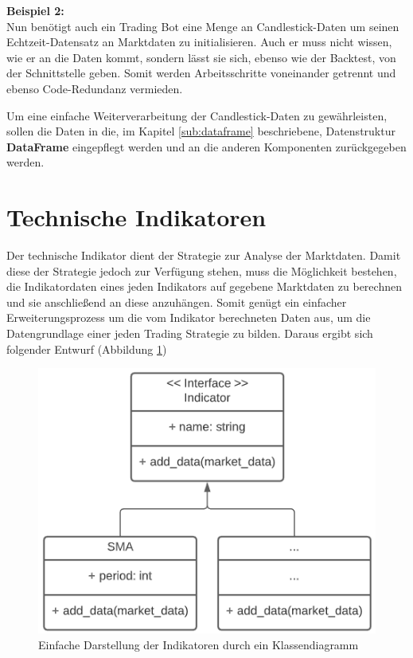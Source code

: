 \documentclass[oneside]{ausarbeitung}
\begin{document}
\textbf{Beispiel 2:} \\
Nun benötigt auch ein Trading Bot eine Menge an Candlestick-Daten um seinen Echtzeit-Datensatz an Marktdaten zu initialisieren. Auch er muss nicht wissen, wie er an die Daten kommt, sondern lässt sie sich, ebenso wie der Backtest, von der Schnittstelle geben. Somit werden Arbeitsschritte voneinander getrennt und ebenso Code-Redundanz vermieden.

Um eine einfache Weiterverarbeitung der Candlestick-Daten zu gewährleisten, sollen die Daten in die, im Kapitel \ref{sub:dataframe} beschriebene, Datenstruktur \textbf{DataFrame} eingepflegt werden und an die anderen Komponenten zurückgegeben werden.


\newpage
\section{Technische Indikatoren}
\label{sec:technische_Indikatoren}

Der technische Indikator dient der Strategie zur Analyse der Marktdaten. Damit diese der Strategie jedoch zur Verfügung stehen, muss die Möglichkeit bestehen, die Indikatordaten eines jeden Indikators auf gegebene Marktdaten zu berechnen und sie anschließend an diese anzuhängen. Somit genügt ein einfacher Erweiterungsprozess um die vom Indikator berechneten Daten aus, um die
Datengrundlage einer jeden Trading Strategie zu bilden. Daraus ergibt sich folgender Entwurf (Abbildung \ref{fig:10})

\begin{figure}[H]
  \centering
  \includegraphics[height=0.34\textheight]{uml/indicators_uml.png}
  \caption{Einfache Darstellung der Indikatoren durch ein Klassendiagramm}
  \label{fig:10}
\end{figure}
\end{document}
